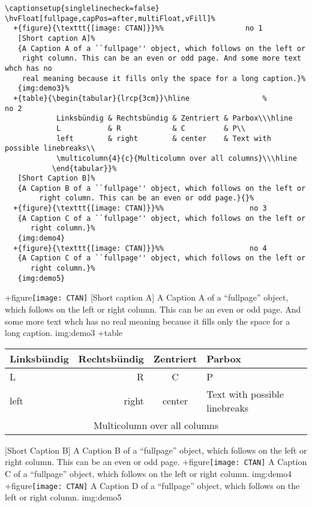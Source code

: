 \documentclass{scrartcl}
\begin{document}
\begin{lstlisting}
\captionsetup{singlelinecheck=false}
\hvFloat[fullpage,capPos=after,multiFloat,vFill]%
  +{figure}{\texttt{[image: CTAN]}}%%                   no 1
   [Short caption A]%
   {A Caption A of a ``fullpage'' object, which follows on the left or
    right column. This can be an even or odd page. And some more text whch has no
    real meaning because it fills only the space for a long caption.}%
   {img:demo3}%
  +{table}{\begin{tabular}{lrcp{3cm}}\hline                 %             no 2
            Linksbündig & Rechtsbündig & Zentriert & Parbox\\\hline
            L           & R            & C         & P\\
            left        & right        & center    & Text with possible linebreaks\\
            \multicolumn{4}{c}{Multicolumn over all columns}\\\hline
           \end{tabular}}%
   [Short Caption B]%
   {A Caption B of a ``fullpage'' object, which follows on the left or
        right column. This can be an even or odd page.}{}%
  +{figure}{\texttt{[image: CTAN]}}%%                    no 3
   {A Caption C of a ``fullpage'' object, which follows on the left or
      right column.}%
   {img:demo4}
  +{figure}{\texttt{[image: CTAN]}}%%                    no 4
   {A Caption C of a ``fullpage'' object, which follows on the left or
      right column.}%
   {img:demo5}
\end{lstlisting}

\Float[Multi]
\captionsetup{singlelinecheck=false}
\hvFloat[fullpage,capPos=after,multiFloat,vFill]%
  +{figure}{\texttt{[image: CTAN]}}%
   [Short caption A]%
   {A Caption A of a ``fullpage'' object, which follows on the left or
    right column. This can be an even or odd page. And some more text whch has no
    real meaning because it fills only the space for a long caption.}%
   {img:demo3}%
  +{table}{\begin{tabular}{lrcp{3cm}}\hline                 %
            Linksbündig & Rechtsbündig & Zentriert & Parbox\\\hline
            L           & R            & C         & P\\
            left        & right        & center    & Text with possible linebreaks\\
            \multicolumn{4}{c}{Multicolumn over all columns}\\\hline
           \end{tabular}}%
   [Short Caption B]%
   {A Caption B of a ``fullpage'' object, which follows on the left or
        right column. This can be an even or odd page.}{}%
  +{figure}{\texttt{[image: CTAN]}}%
   {A Caption C of a ``fullpage'' object, which follows on the left or
      right column.}%
   {img:demo4}
  +{figure}{\texttt{[image: CTAN]}}%
   {A Caption D of a ``fullpage'' object, which follows on the left or
      right column.}%
   {img:demo5}


\blinddocument

\Blindtext

\blindtext
\end{document}
